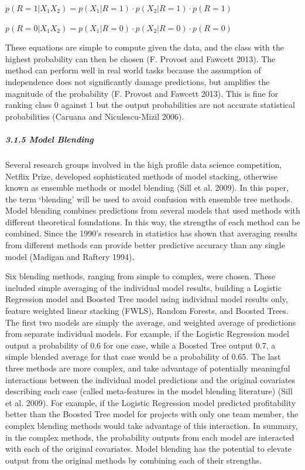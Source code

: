 \documentclass[]{elsarticle} %
\begin{document}
\(p(R = 1|X_1 X_2) = p(X_1|R = 1) \cdot p(X_2|R = 1) \cdot p(R = 1)\)

\(p(R = 0|X_1 X_2) = p(X_1|R = 0) \cdot p(X_2|R = 0) \cdot p(R = 0)\)

These equations are simple to compute given the data, and the class with
the highest probability can then be chosen (F. Provost and Fawcett
2013). The method can perform well in real world tasks because the
assumption of independence does not significantly damage predictions,
but amplifies the magnitude of the probability (F. Provost and Fawcett
2013). This is fine for ranking class 0 against 1 but the output
probabilities are not accurate statistical probabilities (Caruana and
Niculescu-Mizil 2006).

\subparagraph{3.1.5 Model Blending}\label{model-blending}

Several research groups involved in the high profile data science
competition, Netflix Prize, developed sophisticated methods of model
stacking, otherwise known as ensemble methods or model blending (Sill et
al. 2009). In this paper, the term `blending' will be used to avoid
confusion with ensemble tree methods. Model blending combines
predictions from several models that used methods with different
theoretical foundations. In this way, the strengths of each method can
be combined. Since the 1990's research in statistics has shown that
averaging results from different methods can provide better predictive
accuracy than any single model (Madigan and Raftery 1994).

Six blending methods, ranging from simple to complex, were chosen. These
included simple averaging of the individual model results, building a
Logistic Regression model and Boosted Tree model using individual model
results only, feature weighted linear stacking (FWLS), Random Forests,
and Boosted Trees. The first two models are simply the average, and
weighted average of predictions from separate individual models. For
example, if the Logistic Regression model output a probability of 0.6
for one case, while a Boosted Tree output 0.7, a simple blended average
for that case would be a probability of 0.65. The last three methods are
more complex, and take advantage of potentially meaningful interactions
between the individual model predictions and the original covariates
describing each case (called meta-features in the model blending
literature) (Sill et al. 2009). For example, if the Logistic Regression
model predicted profitability better than the Boosted Tree model for
projects with only one team member, the complex blending methods would
take advantage of this interaction. In summary, in the complex methods,
the probability outputs from each model are interacted with each of the
original covariates. Model blending has the potential to elevate output
from the original methods by combining each of their strengths.
\end{document}
